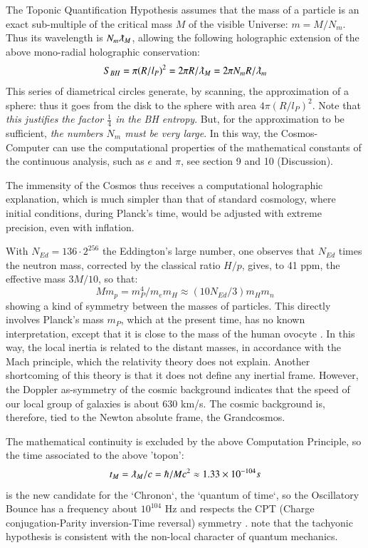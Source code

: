 \documentclass[twoside,draft]{article}
\begin{document}
\begin{sloppypar}
The Toponic Quantification Hypothesis assumes that the mass of a particle is an exact sub-multiple 
of the critical  mass $M$ of the visible Universe: $m = M/N_{m}$. Thus its wavelength is 
$N_m \lambdabar_{M}$, allowing the following holographic extension of the above mono-radial holographic conservation:
\begin{equation}
S_{BH} = \pi(R/l_{P})^{2} = 2\pi R/\lambdabar_{M} = 2\pi N_{m} R/\lambdabar_{m}
\end{equation}
This series of diametrical circles generate, by scanning, the approximation of a sphere: thus it goes 
from the disk to the sphere with area $4\pi(R/l_{P})^{2}$. Note that \textit{this justifies the factor $\frac{1}{4}$ in the BH entropy}. 
But, for the approximation to be sufficient, \textit{the numbers $N_{m}$ must be very large}. In this way, the Cosmos-
Computer can use the computational properties of the mathematical constants of the continuous analysis, such as $e$ and $\pi$, see section 9 and 10 (Discussion).

The immensity of the Cosmos thus receives a computational holographic explanation, which is much simpler than that of standard cosmology, where initial conditions, during Planck's time, would be adjusted with extreme precision, even with inflation. 

With $N_{Ed} = 136 \cdot2^{256}$ the Eddington's large number, one observes that $N_{Ed}$ times the neutron mass, corrected by the classical ratio $H/p$, gives, to 41 ppm, the effective mass $3M/10$, so that:
\begin{equation}
Mm_p = m_P^4/m_em_H\approx(10N_{Ed}/3)m_Hm_n 
\end{equation}
showing a kind of symmetry between the masses of particles. This directly involves Planck's mass $m_{P}$, which at the present time, has no known interpretation, except that it is close to the mass of the human ovocyte \cite{Sanchez1}. In this way, the local inertia is related to the distant masses, in accordance with the Mach principle, which the relativity theory does not explain. Another shortcoming of this theory is that it does not define any inertial frame. However, the Doppler as-symmetry of the cosmic background indicates that the speed of our local group of galaxies is about 630 km/s. The cosmic background is, therefore, tied to the Newton absolute frame, the Grandcosmos.

The mathematical continuity is excluded by the above Computation Principle, so the time associated to the above 'topon': 
\begin{equation}
t_M = \lambdabar_{M} /c = \hbar/Mc^2 \approx 1.33 \times 10^{-104}s 
\end{equation}
is the new candidate for the `Chronon`, the `quantum of time`, so the Oscillatory Bounce has a frequency about $10^{104}$ Hz  \cite{Sanchez2} and respects the CPT (Charge conjugation-Parity inversion-Time reversal) symmetry \cite{Sanchez1}. note that the tachyonic hypothesis is consistent with the non-local character of quantum mechanics.


\end{sloppypar}
\end{document}
